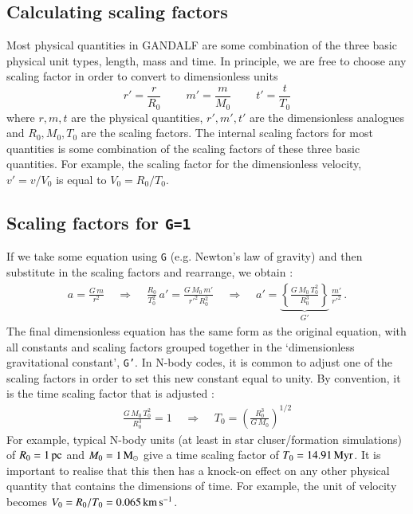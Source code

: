 \documentclass[a4paper]{article}
\newcommand{\var}[1]{\texttt{#1}}
\begin{document}
\subsection{Calculating scaling factors}
Most physical quantities in GANDALF are some combination of the three basic physical unit types, length, mass and time.  In principle, we are free to choose any scaling factor in order to convert to dimensionless units
\begin{equation}
r' = \frac{r}{R_0} \;\;\;\;\;\;\;\;
m' = \frac{m}{M_0} \;\;\;\;\;\;\;\;
t' = \frac{t}{T_0}
\end{equation}
where $r, m, t$ are the physical quantities, $r', m', t'$ are the dimensionless analogues and $R_0, M_0, T_0$ are the scaling factors.  The internal scaling factors for most quantities is some combination of the scaling factors of these three basic quantities.  For example, the scaling factor for the dimensionless velocity, $v' = v/V_0$ is equal to $V_0 = R_0/T_0$.


\subsection{Scaling factors for \var{G=1}}
If we take some equation using \var{G} (e.g. Newton's law of gravity) and then substitute in the scaling factors and rearrange, we obtain :
\begin{eqnarray}
a = \frac{G\,m}{r^2} \;\;\;\; \Rightarrow \;\;\;\;
\frac{R_0}{T_0^2}\,a' = \frac{G\,M_0\,m'}{{r'}^2\,R_0^2} \;\;\;\; \Rightarrow \;\;\;\; a' = \underbrace{\left\{\frac{G\,M_0\,T_0^2}{R_0^3} \right\}}_{G'}\,\frac{m'}{{r'}^2}\,.
\end{eqnarray}
The final dimensionless equation has the same form as the original equation, with all constants and scaling factors grouped together in the `dimensionless gravitational constant', \var{G'}.  In N-body codes, it is common to adjust one of the scaling factors in order to set this new constant equal to unity.  By convention, it is the time scaling factor that is adjusted :
\begin{eqnarray}
\frac{G\,M_0\,T_0^2}{R_0^3} = 1 \;\;\;\; \Rightarrow \;\;\;\;T_0 = \left( \frac{R_0^3}{G\,M_0} \right)^{1/2}
\end{eqnarray}
For example, typical N-body units (at least in star cluser/formation simulations) of $R_0 = 1\,{\rm pc}$ and $M_0 = 1\,{\rm M}_{\odot}$ give a time scaling factor of $T_0 = 14.91\,{\rm Myr}$.  It is important to realise that this then has a knock-on effect on any other physical quantity that contains the dimensions of time.  For example, the unit of velocity becomes $V_0 = R_0/T_0 = 0.065\,{\rm km\,s^{-1}}$.
\end{document}
